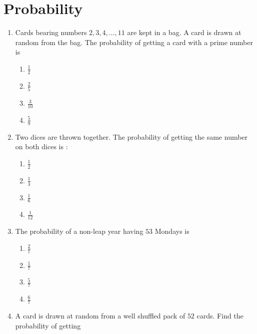 \documentclass[journal,12pt,onecolumn]{IEEEtran}
\theoremstyle{remark}
\begin{document}
\section{Probability}
\begin{enumerate}
\item Cards bearing numbers $2, 3, 4, \ldots, 11$ are kept in a bag. A card is drawn at random from the bag. The probability of getting a card with a prime number is\\
\begin{enumerate}
\item $\frac{1}{2}$\\
\item $\frac{2}{5}$\\
\item $\frac{3}{10}$\\
\item $\frac{5}{9}$\\
\end{enumerate}
\item Two dices are thrown together. The probability of getting the same number on both dices is :\\
\begin{enumerate}
\item $\frac{1}{2}$\\
\item $\frac{1}{3}$\\
\item $\frac{1}{6}$\\
\item $\frac{1}{12}$\\
\end{enumerate}
\item The probability of a non-leap year having $53$ Mondays is \\
\begin{enumerate}
\item $\frac{2}{7}$\\
\item $\frac{1}{7}$\\
\item $\frac{5}{7}$\\
\item $\frac{6}{7}$\\
\end{enumerate}
\item A card is drawn at random from a well shuffled pack of $52$ cards. Find the probability of getting\\
\begin{enumerate}[label=\Roman*.]

\end{enumerate}
\end{enumerate}
\end{document}
